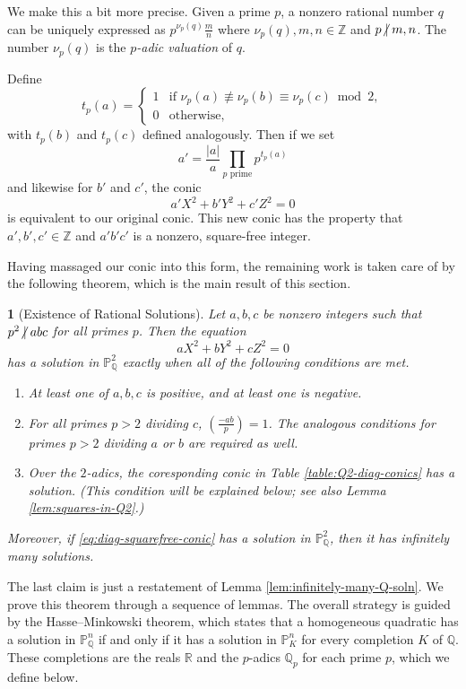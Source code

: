 \documentclass[10pt,a4paper]{amsart}
\numberwithin{equation}{section}
\numberwithin{figure}{section}
\numberwithin{table}{section}
\theoremstyle{definition}
\theoremstyle{plain}
\newtheorem{thm}{\protect\theoremname}[section]
\theoremstyle{remark}
\theoremstyle{plain}
\theoremstyle{definition}
\theoremstyle{plain}
\theoremstyle{plain}
\providecommand{\theoremname}{Theorem}
\newcommand{\legendre}[2]{\genfrac{(}{)}{}{}{#1}{#2}}
\renewcommand{\P}{\mathbb{P}}
\newcommand{\Z}{\mathbb{Z}}
\newcommand{\Q}{\mathbb{Q}}
\newcommand{\R}{\mathbb{R}}
\newcommand{\ndiv}{\centernot|}
\begin{document}
	We make this a bit more precise. Given a prime $p$, a nonzero rational number $q$ can be uniquely expressed as $p^{\nu_p(q)}\frac{m}{n}$ where $\nu_p(q),m,n\in\Z$ and $p\ndiv m,n$. The number $\nu_p(q)$ is the \emph{$p$-adic valuation} of $q$.
	
	Define
	\[
	t_p(a) = \begin{cases}
	1 & \text{if } \nu_p(a)\not\equiv\nu_p(b)\equiv\nu_p(c)\bmod 2,\\
	0 & \text{otherwise,}
	\end{cases}
	\]
	with $t_p(b)$ and $t_p(c)$ defined analogously. Then if we set
	\begin{equation}\label{eq:t_p-squarefree}
	a' = \frac{|a|}{a}\prod_{p \text{ prime}} p^{t_p(a)}
	\end{equation}
	and likewise for $b'$ and $c'$, the conic
	\[
	a'X^2 + b'Y^2 + c'Z^2 = 0
	\]
	is equivalent to our original conic. This new conic has the property that $a',b',c'\in \Z$ and $a'b'c'$ is a nonzero, square-free integer.
	
	Having massaged our conic into this form, the remaining work is taken care of by the following theorem, which is the main result of this section.
	\begin{thm}[Existence of Rational Solutions]\label{thm:rational-solutions}
		Let $a,b,c$ be nonzero integers such that $p^2 \ndiv abc$ for all primes $p$. Then the equation
		\begin{equation}\label{eq:diag-squarefree-conic}
		aX^2 + bY^2 + cZ^2 = 0
		\end{equation}
		has a solution in $\P^2_\Q$ exactly when all of the following conditions are met.
		\begin{enumerate}
			\item\label{cond:real-soln} At least one of $a,b,c$ is positive, and at least one is negative.
			\item\label{cond:Qp-soln} For all primes $p>2$ dividing $c$, $\legendre{-ab}{p} = 1$. The analogous conditions for primes $p>2$ dividing $a$ or $b$ are required as well.
			\item\label{cond:Q2-soln} Over the $2$-adics, the coresponding conic in Table \ref{table:Q2-diag-conics} has a solution. (This condition will be explained below; see also Lemma 
			\ref{lem:squares-in-Q2}.)
		\end{enumerate}
		Moreover, if \eqref{eq:diag-squarefree-conic} has a solution in $\P^2_\Q$, then it has infinitely many solutions.
	\end{thm}
	The last claim is just a restatement of Lemma \ref{lem:infinitely-many-Q-soln}.
	We prove this theorem through a sequence of lemmas. The overall strategy is guided by the Hasse--Minkowski theorem, which states that a homogeneous quadratic has a solution in $\P^n_\Q$ if and only if it has a solution in $\P^n_K$ for every completion $K$ of $\Q$. These completions are the reals $\R$ and the $p$-adics $\Q_p$ for each prime $p$, which we define below.
	
\end{document}
